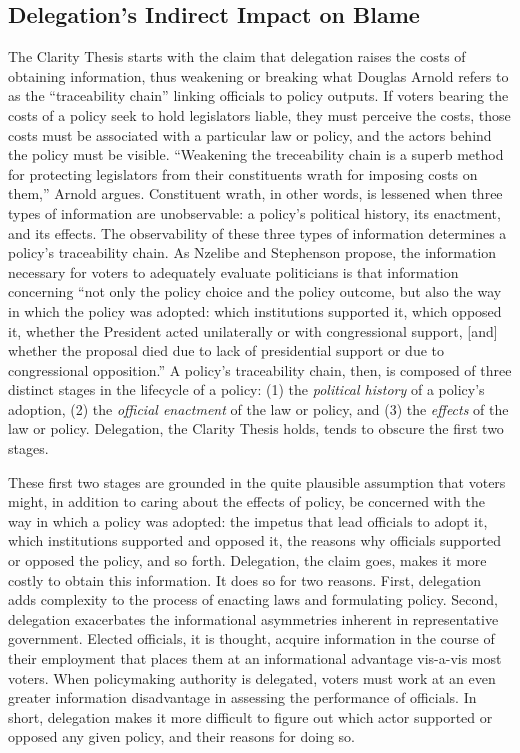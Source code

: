 \documentclass{article}
\begin{document}
\subsection{Delegation's Indirect Impact on Blame}

The Clarity Thesis starts with the claim that delegation raises the costs of obtaining information, thus weakening or breaking what Douglas Arnold refers to as the ``traceability chain'' linking officials to policy outputs. \citep[p. 100]{Arnold1990} If voters bearing the costs of a policy seek to hold legislators liable, they must perceive the costs, those costs must be associated with a particular law or policy, and the actors behind the policy must be visible. \citep{Arnold1990} ``Weakening the treceability chain is a superb method for protecting legislators from their constituents wrath for imposing costs on them,'' Arnold argues. \citep[p. 100]{Arnold1990} Constituent wrath, in other words, is lessened when three types of information are unobservable: a policy's political history, its enactment, and its effects. The observability of these three types of information determines a policy's traceability chain. As Nzelibe and Stephenson propose, the information necessary for voters to adequately evaluate politicians is that information concerning ``not only the policy choice and the policy outcome, but also the way in which the policy was adopted: which institutions supported it, which opposed it, whether the President acted unilaterally or with congressional support, [and] whether the proposal died due to lack of presidential support or due to congressional opposition.'' \citep[p. 652]{Nzelibe2010} A policy's traceability chain, then, is composed of three distinct stages in the lifecycle of a policy: (1) the \emph{political history} of a policy's adoption, (2) the \emph{official enactment} of the law or policy, and (3) the \emph{effects} of the law or policy. Delegation, the Clarity Thesis holds, tends to obscure the first two stages. 

These first two stages are grounded in the quite plausible assumption that voters might, in addition to caring about the effects of policy, be concerned with the way in which a policy was adopted: the impetus that lead officials to adopt it, which institutions supported and opposed it, the reasons why officials supported or opposed the policy, and so forth. Delegation, the claim goes, makes it more costly to obtain this information. It does so for two reasons. First, delegation adds complexity to the process of enacting laws and formulating policy. Second, delegation exacerbates the informational asymmetries inherent in representative government. Elected officials, it is thought, acquire information in the course of their employment that places them at an informational advantage vis-a-vis most voters. When policymaking authority is delegated, voters must work at an even greater information disadvantage in assessing the performance of officials.\citep{Gersen2010b} In short, delegation makes it more difficult to figure out which actor supported or opposed any given policy, and their reasons for doing so.
\end{document}
